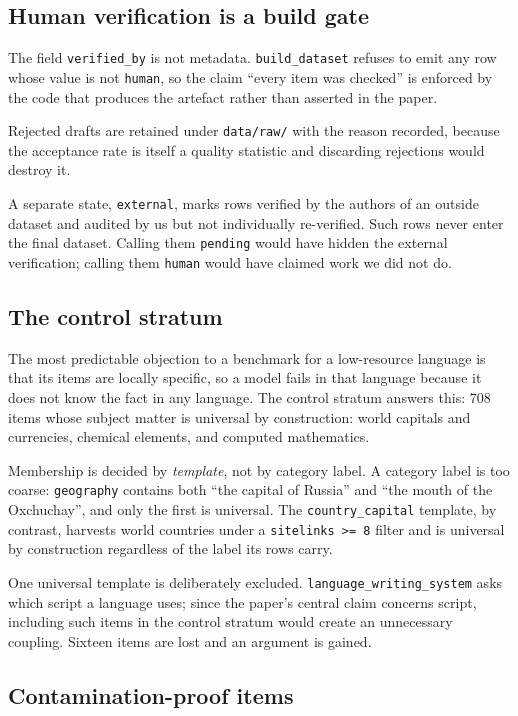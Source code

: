\documentclass[final]{clv2025}
\begin{document}
\subsection{Human verification is a build gate}

The field \texttt{verified\_by} is not metadata. \texttt{build\_dataset}
refuses to emit any row whose value is not \texttt{human}, so the claim ``every
item was checked'' is enforced by the code that produces the artefact rather
than asserted in the paper.

Rejected drafts are retained under \texttt{data/raw/} with the reason recorded,
because the acceptance rate is itself a quality statistic and discarding
rejections would destroy it.

A separate state, \texttt{external}, marks rows verified by the authors of an
outside dataset and audited by us but not individually re-verified. Such rows
never enter the final dataset. Calling them \texttt{pending} would have hidden
the external verification; calling them \texttt{human} would have claimed work
we did not do.

\subsection{The control stratum}

The most predictable objection to a benchmark for a low-resource language is
that its items are locally specific, so a model fails in that language because
it does not know the fact in any language. The control stratum answers this:
708 items whose subject matter is universal by construction: world capitals and
currencies, chemical elements, and computed mathematics.

Membership is decided by \emph{template}, not by category label. A category
label is too coarse: \texttt{geography} contains both ``the capital of Russia''
and ``the mouth of the Oxchuchay'', and only the first is universal. The
\texttt{country\_capital} template, by contrast, harvests world countries under
a \texttt{sitelinks >= 8} filter and is universal by construction regardless of
the label its rows carry.

One universal template is deliberately excluded.
\texttt{language\_writing\_system} asks which script a language uses; since the
paper's central claim concerns script, including such items in the control
stratum would create an unnecessary coupling. Sixteen items are lost and an
argument is gained.

\subsection{Contamination-proof items}
\end{document}
